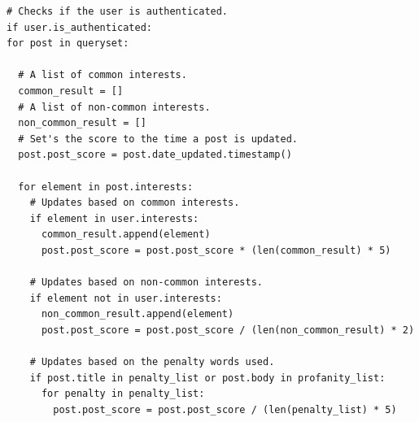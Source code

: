 \lstset{language=Python}
\lstset{frame=lines}
\begin{lstlisting}
# Checks if the user is authenticated.
if user.is_authenticated:
for post in queryset:

  # A list of common interests.
  common_result = []
  # A list of non-common interests.
  non_common_result = []
  # Set's the score to the time a post is updated.
  post.post_score = post.date_updated.timestamp()

  for element in post.interests:
    # Updates based on common interests.
    if element in user.interests:
      common_result.append(element)
      post.post_score = post.post_score * (len(common_result) * 5)

    # Updates based on non-common interests.
    if element not in user.interests:
      non_common_result.append(element)
      post.post_score = post.post_score / (len(non_common_result) * 2)

    # Updates based on the penalty words used.
    if post.title in penalty_list or post.body in profanity_list:
      for penalty in penalty_list:
        post.post_score = post.post_score / (len(penalty_list) * 5)
\end{lstlisting}
